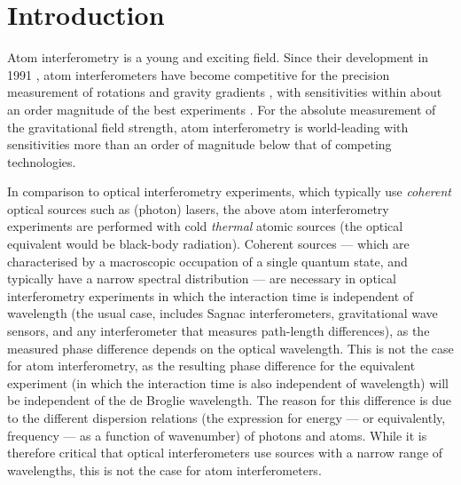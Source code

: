 \chapter{Introduction}
\label{Introduction}
\graphicspath{{Figures/Introduction/}{Figures/Common/}}


Atom interferometry is a young and exciting field.  Since their development in 1991 \citep{Carnal:1991,Keith:1991,Riehle:1991,Kasevich:1991}, atom interferometers have become competitive for the precision measurement of rotations \citep{McGuirk:2002} and gravity gradients \citep{Gustavson:2000}, with sensitivities within about an order magnitude of the best experiments \citep{Schreiber:2008,Moody:1993,Kann:1994}.  For the absolute measurement of the gravitational field strength, atom interferometry is world-leading \citep{Muller:2008} with sensitivities more than an order of magnitude below that of competing technologies.

In comparison to optical interferometry experiments, which typically use \emph{coherent} optical sources such as (photon) lasers, the above atom interferometry experiments are performed with cold \emph{thermal} atomic sources (the optical equivalent would be black-body radiation).  Coherent sources --- which are characterised by a macroscopic occupation of a single quantum state, and typically have a narrow spectral distribution --- are necessary in optical interferometry experiments in which the interaction time is independent of wavelength (the usual case, includes Sagnac interferometers, gravitational wave sensors, and any interferometer that measures path-length differences), as the measured phase difference depends on the optical wavelength.  This is not the case for atom interferometry, as the resulting phase difference for the equivalent experiment (in which the interaction time is also independent of wavelength) will be independent of the de Broglie wavelength.  The reason for this difference is due to the different dispersion relations (the expression for energy --- or equivalently, frequency --- as a function of wavenumber) of photons and atoms.  While it is therefore critical that optical interferometers use sources with a narrow range of wavelengths, this is not the case for atom interferometers.

